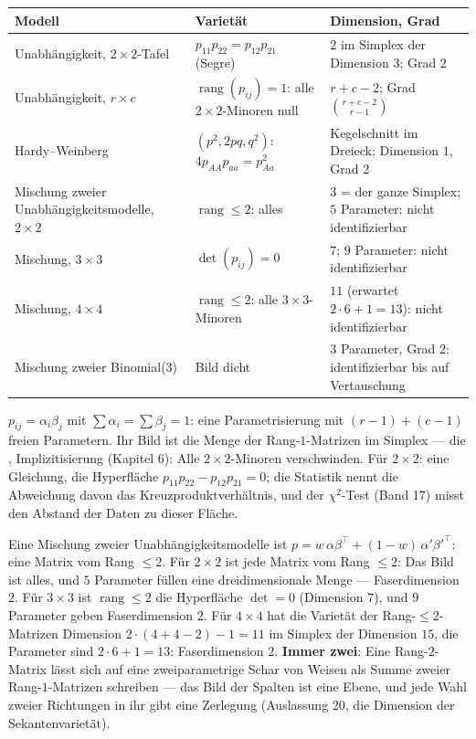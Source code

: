 \begin{merksatz}
\begin{center}
{\small
\renewcommand{\arraystretch}{1.5}
\begin{tabular}{@{}P{2.9cm}P{3.0cm}P{2.9cm}@{}}
\toprule
\textbf{Modell} & \textbf{Varietät} & \textbf{Dimension, Grad}\\
\midrule
Unab\-hängig\-keit, $2\times2$-Tafel & $p_{11}p_{22} = p_{12}p_{21}$ (Segre) & $2$ im Simplex der Dimension $3$; Grad $2$\\
Unab\-hängig\-keit, $r\times c$ & $\operatorname{rang}(p_{ij}) = 1$: alle $2\times2$-Minoren null & $r + c - 2$; Grad $\binom{r+c-2}{r-1}$\\
Hardy--Weinberg & $(p^{2}, 2pq, q^{2})$: $4p_{AA}p_{aa} = p_{Aa}^{2}$ & Kegelschnitt im Dreieck; Dimension $1$, Grad $2$\\
Mischung zweier Unab\-hängig\-keits\-modelle, $2\times2$ & $\operatorname{rang}\le2$: alles & $3$ = der ganze Simplex; $5$ Parameter: nicht identifizierbar\\
Mischung, $3\times3$ & $\det(p_{ij}) = 0$ & $7$; $9$ Parameter: nicht identifizierbar\\
Mischung, $4\times4$ & $\operatorname{rang}\le2$: alle $3\times3$-Minoren & $11$ (erwartet $2\cdot6 + 1 = 13$): nicht identifizierbar\\
Mischung zweier Binomial($3$) & Bild dicht & $3$ Parameter, Grad $2$: identifizierbar bis auf Vertauschung\\
\bottomrule
\end{tabular}}
\end{center}

$p_{ij} = \alpha_i\beta_j$ mit $\sum\alpha_i = \sum\beta_j = 1$: eine Parametrisierung mit $(r - 1) + (c - 1)$ freien Parametern. Ihr Bild ist die Menge der Rang-$1$-Matrizen im Simplex --- die , Implizitisierung (Kapitel 6): Alle $2\times2$-Minoren verschwinden. Für $2\times2$: eine Gleichung, die Hyperfläche $p_{11}p_{22} - p_{12}p_{21} = 0$; die Statistik nennt die Abweichung davon das Kreuzproduktverhältnis, und der $\chi^{2}$-Test (Band 17) misst den Abstand der Daten zu dieser Fläche.

Eine Mischung zweier Unabhängigkeitsmodelle ist $p = w\,\alpha\beta^{\top} + (1 - w)\,\alpha'\beta'^{\top}$: eine Matrix vom Rang $\le2$. Für $2\times2$ ist jede Matrix vom Rang $\le2$: Das Bild ist alles, und $5$ Parameter füllen eine dreidimensionale Menge --- Faserdimension $2$. Für $3\times3$ ist $\operatorname{rang}\le2$ die Hyperfläche $\det = 0$ (Dimension $7$), und $9$ Parameter geben Faserdimension $2$. Für $4\times4$ hat die Varietät der Rang-$\le2$-Matrizen Dimension $2\cdot(4 + 4 - 2) - 1 = 11$ im Simplex der Dimension $15$, die Parameter sind $2\cdot6 + 1 = 13$: Faserdimension $2$. \textbf{Immer zwei}: Eine Rang-$2$-Matrix lässt sich auf eine zweiparametrige Schar von Weisen als Summe zweier Rang-$1$-Matrizen schreiben --- das Bild der Spalten ist eine Ebene, und jede Wahl zweier Richtungen in ihr gibt eine Zerlegung (Auslassung 20, die Dimension der Sekantenvarietät).


\end{merksatz}
